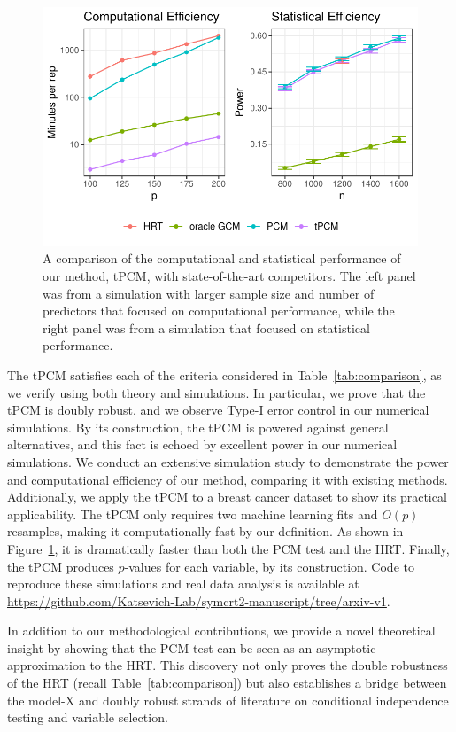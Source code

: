 \documentclass[12pt]{article}
\theoremstyle{definition}
\theoremstyle{remark}
\begin{document}
	\begin{figure}[h!]
		\centering
		\includegraphics{figures/figure_1.pdf}
		\caption{A comparison of the computational and statistical performance of our method, tPCM, with state-of-the-art competitors. The left panel was from a simulation with larger sample size and number of predictors that focused on computational performance, while the right panel was from a simulation that focused on statistical performance.}
		\label{fig:comp_stat_efficiency}
	\end{figure}
	
	The tPCM satisfies each of the criteria considered in Table~\ref{tab:comparison}, as we verify using both theory and simulations. In particular, we prove that the tPCM is doubly robust, and we observe Type-I error control in our numerical simulations. By its construction, the tPCM is powered against general alternatives, and this fact is echoed by excellent power in our numerical simulations. We conduct an extensive simulation study to demonstrate the power and computational efficiency of our method, comparing it with existing methods. Additionally, we apply the tPCM to a breast cancer dataset to show its practical applicability. The tPCM only requires two machine learning fits and $O(p)$ resamples, making it computationally fast by our definition. As shown in Figure~\ref{fig:comp_stat_efficiency}, it is dramatically faster than both the PCM test and the HRT. Finally, the tPCM produces $p$-values for each variable, by its construction. Code to reproduce these simulations and real data analysis is available at \url{https://github.com/Katsevich-Lab/symcrt2-manuscript/tree/arxiv-v1}.
	
	In addition to our methodological contributions, we provide a novel theoretical insight by showing that the PCM test can be seen as an asymptotic approximation to the HRT. This discovery not only proves the double robustness of the HRT (recall Table~\ref{tab:comparison}) but also establishes a bridge between the model-X and doubly robust strands of literature on conditional independence testing and variable selection.
\end{document}
